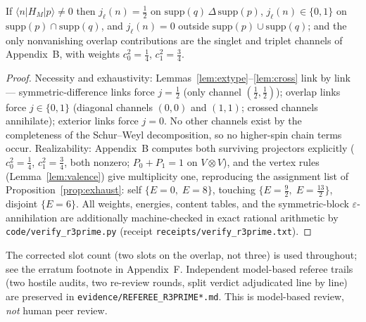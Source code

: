 \begin{theorem}
\label{thm:r3prime}
If $\langle n|H_M|p\rangle\ne 0$ then $j_\ell(n)=\tfrac12$ on
$\mathrm{supp}(q)\,\Delta\,\mathrm{supp}(p)$, $j_\ell(n)\in\{0,1\}$ on
$\mathrm{supp}(p)\cap\mathrm{supp}(q)$, and $j_\ell(n)=0$ outside
$\mathrm{supp}(p)\cup\mathrm{supp}(q)$; and the only nonvanishing
overlap contributions are the singlet and triplet channels of
Appendix~B, with weights $c_0^2=\tfrac14$, $c_1^2=\tfrac34$.
\end{theorem}
\begin{proof}
Necessity and exhaustivity: Lemmas~\ref{lem:extype}--\ref{lem:cross}
link by link --- symmetric-difference links force $j=\tfrac12$ (only
channel $(\tfrac12,\tfrac12)$); overlap links force $j\in\{0,1\}$
(diagonal channels $(0,0)$ and $(1,1)$; crossed channels annihilate);
exterior links force $j=0$. No other channels exist by the completeness
of the Schur--Weyl decomposition, so no higher-spin chain terms occur.
Realizability: Appendix~B computes both surviving projectors explicitly
($c_0^2=\tfrac14$, $c_1^2=\tfrac34$, both nonzero; $P_0+P_1=1$ on
$V\otimes V$), and the vertex rules (Lemma~\ref{lem:valence}) give
multiplicity one, reproducing the assignment list of
Proposition~\ref{prop:exhaust}: self $\{E=0,\;E=8\}$, touching
$\{E=\tfrac92,\;E=\tfrac{13}{2}\}$, disjoint $\{E=6\}$. All weights,
energies, content tables, and the symmetric-block $\varepsilon$-annihilation
are additionally machine-checked in exact rational arithmetic by
\texttt{code/verify\_r3prime.py} (receipt
\texttt{receipts/verify\_r3prime.txt}).
\end{proof}

\begin{remark}
The corrected slot count (two slots on the overlap, not three) is used
throughout; see the erratum footnote in Appendix~F. Independent
model-based referee trails (two hostile audits, two re-review rounds,
split verdict adjudicated line by line) are preserved in
\texttt{evidence/REFEREE\_R3PRIME*.md}. This is model-based review,
\emph{not} human peer review.
\end{remark}
